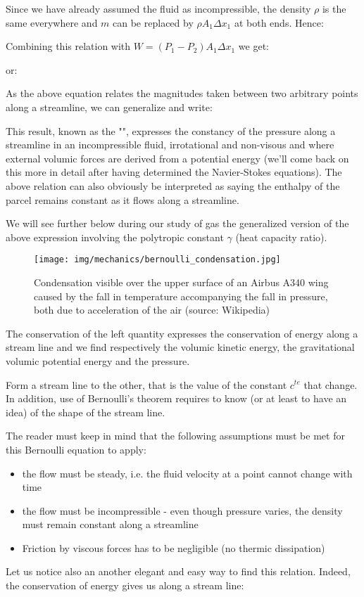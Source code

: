 	Since we have already assumed the fluid as incompressible, the density $\rho$ is the same everywhere and $m$ can be replaced by $\rho A_1\Delta x_1$ at both ends. Hence:
	
	Combining this relation with $W=(P_1-P_2)A_1\Delta x_1$ we get:
	
	or:
	
	As the above equation relates the magnitudes taken between two arbitrary points along a streamline, we can generalize and write:
	
	This result, known as the "", expresses the constancy of the pressure along a streamline in an incompressible fluid, irrotational and non-visous and where external volumic forces are derived from a potential energy (we'll come back on this more in detail after having determined the Navier-Stokes equations). The above relation can also obviously be interpreted as saying the enthalpy of the parcel remains constant as it flows along a streamline.
	
	We will see further below during our study of gas the generalized version of the above expression involving the polytropic constant $\gamma$ (heat capacity ratio).
	\begin{figure}[H]
		\centering
		\texttt{[image: img/mechanics/bernoulli\_condensation.jpg]}
		\caption{Condensation visible over the upper surface of an Airbus A340 wing caused by the fall in temperature accompanying the fall in pressure, both due to acceleration of the air (source: Wikipedia)}
	\end{figure}
	
	The conservation of the left quantity expresses the conservation of energy along a stream line and we find respectively the volumic kinetic energy, the gravitational volumic potential energy and the pressure.
	\begin{tcolorbox}[title=Remark,colframe=black,arc=10pt]
	Form a stream line to the other, that is the value of the constant $c^{te}$ that change. In addition, use of Bernoulli's theorem requires to know (or at least to have an idea) of the shape of the stream line.
	\end{tcolorbox}
	
	The reader must keep in mind that the following assumptions must be met for this Bernoulli equation to apply:
	\begin{itemize}
		\item the flow must be steady, i.e. the fluid velocity at a point cannot change with time

		\item the flow must be incompressible - even though pressure varies, the density must remain constant along a streamline
		
		\item Friction by viscous forces has to be negligible (no thermic dissipation)
	\end{itemize}
	Let us notice also an another elegant and easy way to find this relation. Indeed, the conservation of energy gives us along a stream line:
	
